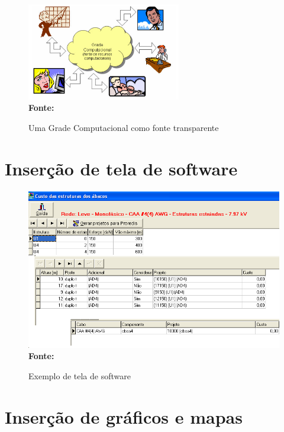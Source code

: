 \begin{figure}[ht]
	\centering	
	\caption[\hspace{0.1cm}Grade Computacional.]{Uma Grade Computacional como fonte transparente}
	\vspace{-0.4cm}
	\includegraphics[width=0.6\textwidth]{figuras/grade-comp.png}
	\\\textbf{\footnotesize Fonte:  }
	\label{fig:figura1}
\end{figure}
\vspace{-0.5cm}

\section{\esp Inserção de tela de software}

\begin{figure}[!ht]
	\centering	
	\caption[\hspace{0.1cm}Exemplo de tela de software.]{Exemplo de tela de software}
	\includegraphics[width=.8\textwidth]{figuras/tela1.png}
	\\\textbf{\footnotesize Fonte: }
	\label{fig:tela1}
\end{figure}

\section{\esp Inserção de gráficos e mapas}

